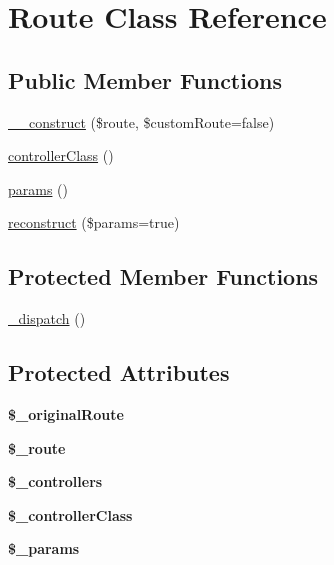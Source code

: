 \hypertarget{classRoute}{
\section{Route Class Reference}
\label{classRoute}
}
\subsection*{Public Member Functions}
\begin{DoxyCompactItemize}
\item 
\hyperlink{classRoute_a84933c8ee82f1e6f131b31a886eb45df}{\_\-\_\-construct} (\$route, \$customRoute=false)
\item 
\hyperlink{classRoute_a35a64db30f3a4fca7bf9d7c93609e6e7}{controllerClass} ()
\item 
\hyperlink{classRoute_ae03c1aa3164e2d41ef2d0d49a971af77}{params} ()
\item 
\hyperlink{classRoute_a97e57ba763516caf32fb7ecfb5e78a1d}{reconstruct} (\$params=true)
\end{DoxyCompactItemize}
\subsection*{Protected Member Functions}
\begin{DoxyCompactItemize}
\item 
\hyperlink{classRoute_a803115e927944fa64e86dedfa410cbdd}{\_\-dispatch} ()
\end{DoxyCompactItemize}
\subsection*{Protected Attributes}
\begin{DoxyCompactItemize}
\item 
\hypertarget{classRoute_a0f02597a98e8300aa3f1f3db9e7d78df}{
{\bfseries \$\_\-originalRoute}}
\label{classRoute_a0f02597a98e8300aa3f1f3db9e7d78df}

\item 
\hypertarget{classRoute_a88b214a66d19b32401b3e4757b0c8377}{
{\bfseries \$\_\-route}}
\label{classRoute_a88b214a66d19b32401b3e4757b0c8377}

\item 
\hypertarget{classRoute_a2d7b485f67afe8e0e175f9c94d9c9b4b}{
{\bfseries \$\_\-controllers}}
\label{classRoute_a2d7b485f67afe8e0e175f9c94d9c9b4b}

\item 
\hypertarget{classRoute_a62ebbc1f5dd9bde011be85d0f695261a}{
{\bfseries \$\_\-controllerClass}}
\label{classRoute_a62ebbc1f5dd9bde011be85d0f695261a}

\item 
\hypertarget{classRoute_af46f1787647f8577faa313e7d2c4e3f2}{
{\bfseries \$\_\-params}}
\label{classRoute_af46f1787647f8577faa313e7d2c4e3f2}

\end{DoxyCompactItemize}


